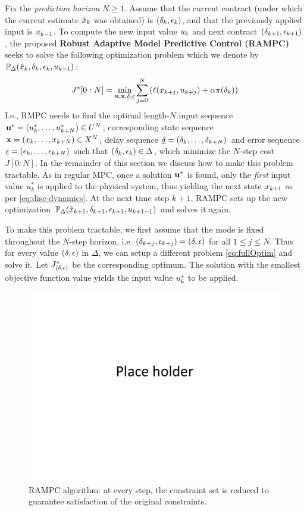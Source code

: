 Fix the \emph{prediction horizon} $N \geq 1$.
Assume that the current contract (under which the current estimate $\hat{x}_k$ was obtained) is $(\delta_{k},\epsilon_{k})$, and that the previously applied input is $u_{k-1}$.
To compute the new input value $u_{k}$ and next contract $(\delta_{k+1},\epsilon_{k+1})$, the proposed \textbf{Robust Adaptive Model Predictive Control (RAMPC)} seeks to solve the following optimization problem which we denote by $\mathbb{P}_{\Delta}(\hat{x}_{k},\delta_{k},\epsilon_{k},u_{k -1})$:
\begin{eqnarray}
\label{eq:fullOptim}
J^*[0:N]= \min_{\mathbf{u},\mathbf{x},\underline{\delta},\underline{\epsilon}}\sum_{j=0}^{N}\left(\ell(x_{k+j},u_{k+j})+\alpha\pi(\delta_k)\right)
\end{eqnarray}
I.e., RMPC needs to find the optimal length-$N$ input sequence  $\mathbf{u}^* = (u_k^*,\ldots,u_{k+N}^*) \in U^N$, corresponding state sequence $\mathbf{x} = (x_k,\ldots,x_{k+N}) \in X^N$, delay sequence $\underline{\delta} = (\delta_k,\ldots,\delta_{k+N})$ and error sequence $\underline{\epsilon} = (\epsilon_k,\ldots,\epsilon_{k+N})$ such that $(\delta_{k},\epsilon_{k}) \in \Delta$, which minimize the $N$-step cost $J[0:N]$.
In the remainder of this section we discuss how to make this problem tractable.
As in regular MPC, once a solution $\mathbf{u}^*$ is found, only the \emph{first} input value $u_k^*$ is applied to the physical system, thus yielding the next state $x_{k+1}$ as per \eqref{eq:disc-dynamics}.
At the next time step $k+1$, RAMPC sets up the new optimization $\mathbb{P}_{\Delta}(\hat{x}_{k+1},\delta_{k+1},\epsilon_{k+1},u_{k+1 -1})$ and solves it again.

To make this problem tractable, we first assume that the mode is fixed throughout the $N$-step horizon, i.e. $(\delta_{k+j},\epsilon_{k+j}) = (\delta,\epsilon)$ for all $1 \leq j \leq N$.
Thus for every value $(\delta,\epsilon)$ in $\Delta$, we can setup a different problem \eqref{eq:fullOptim} and solve it.
Let $J_{(\delta,\epsilon)}^*$ be the corresponding optimum.
The solution with the smallest objective function value yields the input value $u^*_k$ to be applied.

\begin{figure}[t]
\centering
\includegraphics[width=0.7\linewidth]{figures/placeHolder}
\caption{RAMPC algorithm: at every step, the constraint set is reduced to guarantee satisfaction of the original constraints.}
\label{fig:placeHolder}
\end{figure}

